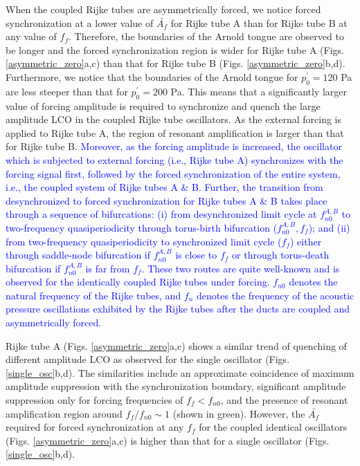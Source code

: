 \documentclass[%
preprint,
 amsmath,amssymb,
 aps,
 pra,
]{revtex4-2}
\begin{document}
When the coupled Rijke tubes are asymmetrically forced, we notice forced synchronization at a lower value of $\bar{A_f}$ for Rijke tube A than for Rijke tube B at any value of $f_f$. Therefore, the boundaries of the Arnold tongue are observed to be longer and the forced synchronization region is wider for Rijke tube A (Figs. \ref{asymmetric_zero}a,c) than that for Rijke tube B (Figs. \ref{asymmetric_zero}b,d). Furthermore, we notice that the boundaries of the Arnold tongue for $p^\prime_{0} = 120$ Pa are less steeper than that for $p^\prime_{0} = 200$ Pa. This means that a significantly larger value of forcing amplitude is required to synchronize and quench the large amplitude LCO in the coupled Rijke tube oscillators. As the external forcing is applied to Rijke tube A, the region of resonant amplification is larger than that for Rijke tube B. \textcolor{blue}{Moreover, as the forcing amplitude is increased, the oscillator which is subjected to external forcing (i.e., Rijke tube A) synchronizes with the forcing signal first, followed by the forced synchronization of the entire system, i.e., the coupled system of Rijke tubes A \& B. Further, the transition from desynchronized to forced synchronization for Rijke tubes A \& B takes place through a sequence of bifurcations: (i) from desynchronized limit cycle at $f_{n0}^{A,B}$ to two-frequency quasiperiodicity through torus-birth bifurcation ($f_{n0}^{A,B},f_f$); and (ii) from two-frequency quasiperiodicity to synchronized limit cycle ($f_f$) either through saddle-node bifurcation if $f_{n0}^{A,B}$ is close to $f_f$ or through torus-death bifurcation if  $f_{n0}^{A,B}$ is far from $f_f$. These two routes are quite well-known \cite{balanov2008synchronization} and is observed for the identically coupled Rijke tubes under forcing. $f_{n0}$ denotes the natural frequency of the Rijke tubes, and $f_{n}$ denotes the frequency of the acoustic pressure oscillations exhibited by the Rijke tubes after the ducts are coupled and asymmetrically forced.}

Rijke tube A (Figs. \ref{asymmetric_zero}a,c) shows a similar trend of quenching of different amplitude LCO as observed for the single oscillator (Figs. \ref{single_osc}b,d). The similarities include an approximate coincidence of maximum amplitude suppression with the synchronization boundary, significant amplitude suppression only for forcing frequencies of $f_f<f_{n0}$, and the presence of resonant amplification region around $f_f/f_{n0} \sim 1$ (shown in green). However, the $\bar{A_f}$ required for forced synchronization at any $f_f$ for the coupled identical oscillators (Figs. \ref{asymmetric_zero}a,c) is higher than that for a single oscillator (Figs. \ref{single_osc}b,d).
\end{document}
